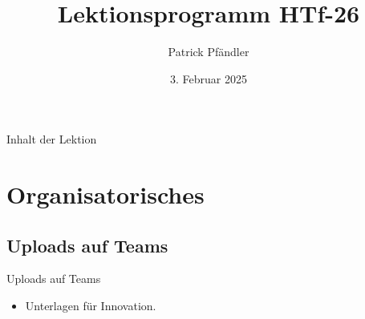 \def\customoptions{aspectratio=169} %



\title{\textbf{Lektionsprogramm HTf-26}}
\author{Patrick Pfändler}
\date{3. Februar 2025}




\frame{\titlepage}

\begin{frame}{Inhalt der Lektion}
    \tableofcontents
\end{frame}





\section{Organisatorisches}
\BlueSectionSlide

\subsection{Uploads auf Teams}
\begin{frame}{Uploads auf Teams}
    \begin{itemize}
        \item[\textbullet] Unterlagen für Innovation.
    \end{itemize}

\end{frame}



